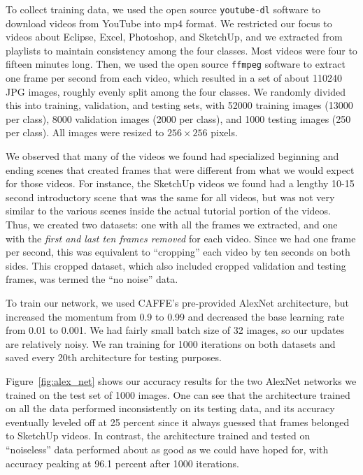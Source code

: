 \documentclass[10pt]{article}
\begin{document}
To collect training data, we used the open source \texttt{youtube-dl} software to download videos
from YouTube into mp4 format. We restricted our focus to videos about Eclipse, Excel, Photoshop, and
SketchUp, and we extracted from playlists to maintain consistency among the four classes. Most
videos were four to fifteen minutes long.  Then, we used the open source \texttt{ffmpeg} software to
extract one frame per second from each video, which resulted in a set of about 110240 JPG images,
roughly evenly split among the four classes. We randomly divided this into training, validation, and
testing sets, with 52000 training images (13000 per class), 8000 validation images (2000 per class),
and 1000 testing images (250 per class). All images were resized to $256\times 256$ pixels.

We observed that many of the videos we found had specialized beginning and ending scenes that
created frames that were different from what we would expect for those videos. For instance, the
SketchUp videos we found had a lengthy 10-15 second introductory scene that was the same for all
videos, but was not very similar to the various scenes inside the actual tutorial portion of the
videos. Thus, we created two datasets: one with all the frames we extracted, and one with the
\emph{first and last ten frames removed} for each video. Since we had one frame per second, this was
equivalent to ``cropping'' each video by ten seconds on both sides. This cropped dataset, which also
included cropped validation and testing frames, was termed the ``no noise'' data.

To train our network, we used CAFFE's pre-provided AlexNet architecture, but increased the momentum
from 0.9 to 0.99 and decreased the base learning rate from 0.01 to 0.001. We had fairly small batch
size of 32 images, so our updates are relatively noisy. We ran training for 1000 iterations on both
datasets and saved every 20th architecture for testing purposes.

Figure~\ref{fig:alex_net} shows our accuracy results for the two AlexNet networks we trained on the
test set of 1000 images. One can see that the architecture trained on all the data performed
inconsistently on its testing data, and its accuracy eventually leveled off at 25 percent since it
always guessed that frames belonged to SketchUp videos. In contrast, the architecture trained and
tested on ``noiseless'' data performed about as good as we could have hoped for, with accuracy
peaking at 96.1 percent after 1000 iterations.
\end{document}
